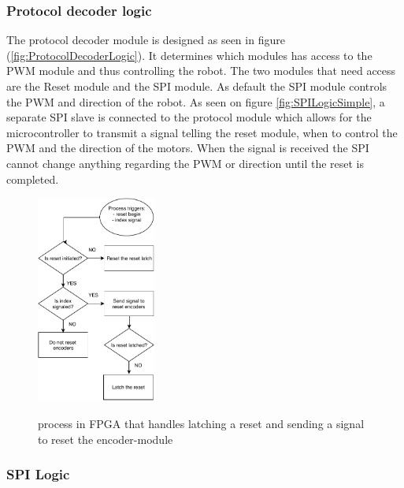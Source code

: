 \documentclass[../../main.tex]{subfiles}
\begin{document}
\subsubsection*{Protocol decoder logic}


The protocol decoder module is designed as seen in figure (\ref{fig:ProtocolDecoderLogic}). It determines which modules has access to the PWM module and thus controlling the robot. The two modules that need access are the Reset module and the SPI module. As default the SPI module controls the PWM and direction of the robot. As seen on figure \ref{fig:SPILogicSimple}, a separate SPI slave is connected to the protocol module which allows for the microcontroller to transmit a signal telling the reset module, when to control the PWM and the direction of the motors. When the signal is received the SPI cannot change anything regarding the PWM or direction until the reset is completed. 



\begin{figure}
\centering
    \caption{process in FPGA that handles latching a reset and sending a signal to reset the encoder-module}
    \includegraphics[width=0.35\textwidth]{Sections/System_Implementation/Images/FPGAFlowchartsResetLatchAndIndex.pdf}
    \label{fig:FPGAFlowchartsResetLatchAndIndex}
\end{figure}

\subsubsection*{SPI Logic}
\end{document}
